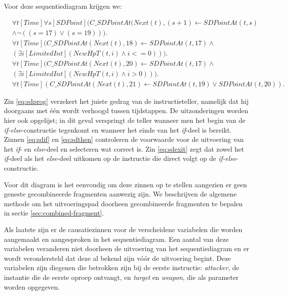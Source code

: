 Voor deze sequentiediagram krijgen we:

\begin{align}
	&\forall{t}[Time]\forall{s}[SDPoint](C\_SDPointAt(Next(t), (s+1) \leftarrow SDPointAt(t, s) \nonumber \\ &\land \lnot{}((s = 17) \lor (s = 19))). \label{eq:sdprog} \\
	&\forall{t}[Time](C\_SDPointAt(Next(t), 18) \leftarrow SDPointAt(t, 17) \land \nonumber \\ &(\exists{i}[LimitedInt](NewHpT(t, i) \land i <= 0))). \label{eq:sdif} \\
	&\forall{t}[Time](C\_SDPointAt(Next(t), 20) \leftarrow SDPointAt(t, 17 ) \land \nonumber \\ &(\exists{i}[LimitedInt](NewHpT(t, i) \land i > 0))). \label{eq:sdthen} \\
	&\forall{t}[Time](C\_SDPointAt(Next(t), 21) \leftarrow SDPointAt(t, 19) \lor SDPointAt(t, 20)). \label{eq:sdexit}
\end{align}

Zin \ref{eq:sdprog} verzekert het juiste gedrag van de instructieteller, namelijk dat hij doorgaans met \'e\'en wordt verhoogd tussen tijdstappen. De uitzonderingen worden hier ook opgelijst; in dit geval verspringt de teller wanneer men het begin van de \textit{if-else}-constructie tegenkomt en wanneer het einde van het \textit{if}-deel is bereikt. Zinnen \ref{eq:sdif} en \ref{eq:sdthen} controleren de voorwaarde voor de uitvoering van het \textit{if}- en \textit{else}-deel en selecteren wat correct is. Zin \ref{eq:sdexit} zegt dat zowel het \textit{if}-deel als het \textit{else}-deel uitkomen op de instructie die direct volgt op de \textit{if-else}-constructie.

Voor dit diagram is het eenvoudig om deze zinnen op te stellen aangezien er geen geneste gecombineerde fragmenten aanwezig zijn. We beschrijven de algemene methode om het uitvoeringspad doorheen gecombineerde fragmenten te bepalen in sectie \ref{sec:combined-fragment}.

\parbreak

Als laatste zijn er de causatiezinnen voor de verscheidene variabelen die worden aangemaakt en aangesproken in het sequentiediagram. Een aantal van deze variabelen veranderen niet doorheen de uitvoering van het sequentiediagram en er wordt verondersteld dat deze al bekend zijn v\'o\'or de uitvoering begint. Deze variabelen zijn diegenen die betrokken zijn bij de eerste instructie: \textit{attacker}, de instantie die de eerste oproep ontvangt, en \textit{target} en \textit{weapon}, die als parameter worden opgegeven.

